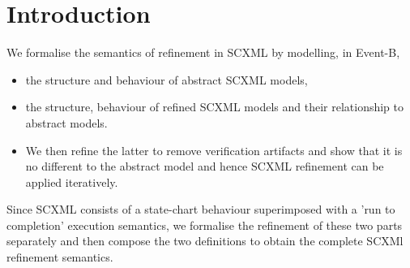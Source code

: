 
\section{Introduction}
We formalise the semantics of refinement in SCXML by modelling, in Event-B,
\begin{itemize}
	\item the structure and behaviour of abstract SCXML models,
	\item the structure, behaviour of refined SCXML models and their relationship to abstract models.
	\item We then refine the latter to remove verification artifacts and show that it is no different to the abstract model and hence SCXML refinement can be applied iteratively.
\end{itemize}

Since SCXML consists of a state-chart behaviour superimposed with a 'run to completion' execution semantics, we formalise the refinement of these two parts separately and then compose the two definitions to obtain the complete SCXMl refinement semantics.